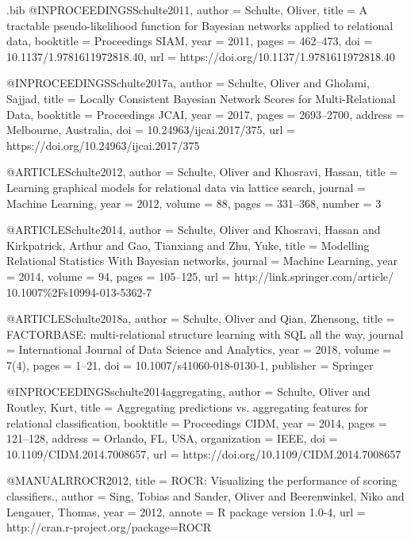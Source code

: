 {\begin{filecontents}{\jobname.bib}
@INPROCEEDINGS{Schulte2011,
  author = {Schulte, Oliver},
  title = {A tractable pseudo-likelihood function for {Bayesian} networks applied
	to relational data},
  booktitle = {Proceedings SIAM},
  year = {2011},
  pages = {462--473},
  doi = {10.1137/1.9781611972818.40},
  url = {https://doi.org/10.1137/1.9781611972818.40}
}

@INPROCEEDINGS{Schulte2017a,
  author = {Schulte, Oliver and Gholami, Sajjad},
  title = {Locally Consistent {Bayesian} Network Scores for Multi-Relational
	Data},
  booktitle = {Proceedings JCAI},
  year = {2017},
  pages = {2693--2700},
  address = {Melbourne, Australia},
  doi = {10.24963/ijcai.2017/375},
  url = {https://doi.org/10.24963/ijcai.2017/375}
}

@ARTICLE{Schulte2012,
  author = {Schulte, Oliver and Khosravi, Hassan},
  title = {Learning graphical models for relational data via lattice search},
  journal = {Machine Learning},
  year = {2012},
  volume = {88},
  pages = {331--368},
  number = {3}
}

@ARTICLE{Schulte2014,
  author = {Schulte, Oliver and Khosravi, Hassan and Kirkpatrick, Arthur and
	Gao, Tianxiang and Zhu, Yuke},
  title = {Modelling Relational Statistics With Bayesian networks},
  journal = {Machine Learning},
  year = {2014},
  volume = {94},
  pages = {105--125},
  url = {http://link.springer.com/article/ 10.1007{\%}2Fs10994-013-5362-7}
}

@ARTICLE{Schulte2018a,
  author = {Schulte, Oliver and Qian, Zhensong},
  title = {{FACTORBASE}: multi-relational structure learning with {SQL} all
	the way},
  journal = {International Journal of Data Science and Analytics},
  year = {2018},
  volume = {7(4)},
  pages = {1--21},
  doi = {10.1007/s41060-018-0130-1},
  publisher = {Springer}
}

@INPROCEEDINGS{schulte2014aggregating,
  author = {Schulte, Oliver and Routley, Kurt},
  title = {Aggregating predictions vs. aggregating features for relational
	classification},
  booktitle = {Proceedings CIDM},
  year = {2014},
  pages = {121--128},
  address = {Orlando, FL, USA},
  organization = {IEEE},
  doi = {10.1109/CIDM.2014.7008657},
  url = {https://doi.org/10.1109/CIDM.2014.7008657}
}

@MANUAL{RROCR2012,
  title = {ROCR: Visualizing the performance of scoring classifiers.},
  author = {Sing, Tobias and Sander, Oliver and Beerenwinkel, Niko and Lengauer,
	Thomas},
  year = {2012},
  annote = {R package version 1.0-4},
  url = {http://cran.r-project.org/package=ROCR}
}


\end{filecontents}}
